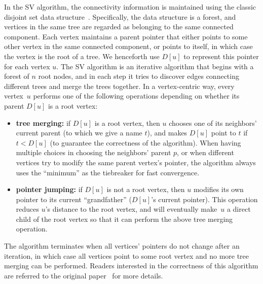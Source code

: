 \documentclass{sokendai_thesis} %
\begin{document}
In the SV algorithm, the connectivity information is maintained using the classic disjoint set data structure~\cite{disjointset}.
Specifically, the data structure is a forest, and vertices in the same tree are regarded as belonging to the same connected component.
Each vertex maintains a parent pointer that either points to some other vertex in the same connected component, or points to itself, in which case the vertex is the root of a tree.
We henceforth use $D[u]$ to represent this pointer for each vertex $u$.
The SV algorithm is an iterative algorithm that begins with a forest of $n$ root nodes, and in each step it tries to discover edges connecting different trees and merge the trees together.
In a vertex-centric way, every vertex~$u$ performs one of the following operations depending on whether its parent $D[u]$ is a root vertex:
\begin{itemize}
 \item \textbf{tree merging:}
  if $D[u]$ is a root vertex, then $u$ chooses one of its neighbors' current parent (to which we give a name $t$), and makes $D[u]$ point to $t$ if $t<D[u]$ (to guarantee the correctness of the algorithm).
  When having multiple choices in choosing the neighbors' parent $p$, or when different vertices try to modify the same parent vertex's pointer, the algorithm always uses the ``minimum'' as the tiebreaker for fast convergence.
 \item \textbf{pointer jumping:}
  if $D[u]$ is not a root vertex, then $u$ modifies its own pointer to its current ``grandfather'' ($D[u]$'s current pointer).
  This operation reduces $u$'s distance to the root vertex, and will eventually make~$u$ a direct child of the root vertex so that it can perform the above tree merging operation.
\end{itemize}
The algorithm terminates when all vertices' pointers do not change after an iteration, in which case all vertices point to some root vertex and no more tree merging can be performed.
Readers interested in the correctness of this algorithm are referred to the original paper~\cite{yan2015effective} for more details.

\end{document}
